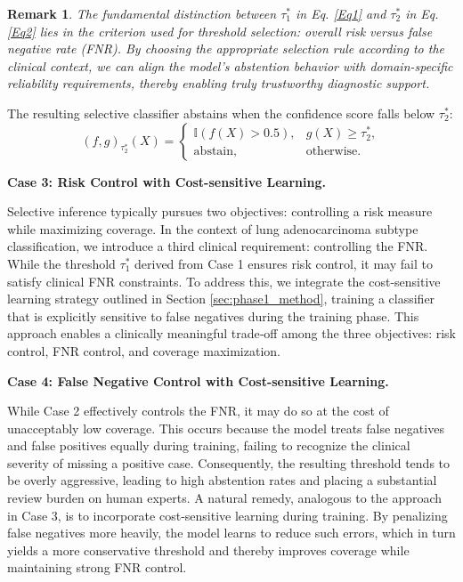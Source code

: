 \documentclass[journal,twoside,web]{ieeecolor}
\newtheorem{remark}[theorem]{Remark}
\begin{document}
\begin{remark}
The fundamental distinction between $\tau_{1}^{*}$ in Eq. \ref{Eq1} and $\tau_{2}^{*}$ in Eq. \ref{Eq2} lies in the criterion used for threshold selection: overall risk versus false negative rate (FNR). By choosing the appropriate selection rule according to the clinical context, we can align the model's abstention behavior with domain-specific reliability requirements, thereby enabling truly trustworthy diagnostic support.
\end{remark}

The resulting selective classifier abstains when the confidence score falls below $\tau_{2}^*$:
\[
(f,g)_{\tau_{2}^*}(X)=
\begin{cases}
\mathbb{I}\!\left(f(X)>0.5\right), & g(X)\geq \tau_{2}^*,\\[4pt]
\text{abstain}, & \text{otherwise}.
\end{cases}
\]


\textbf{Case 3: Risk Control with Cost-sensitive Learning.}

Selective inference typically pursues two objectives: controlling a risk measure while maximizing coverage. In the context of lung adenocarcinoma subtype classification, we introduce a third clinical requirement: controlling the FNR. While the threshold \(\tau_{1}^{*}\) derived from Case 1 ensures risk control, it may fail to satisfy clinical FNR constraints. To address this, we integrate the cost-sensitive learning strategy outlined in Section \ref{sec:phase1_method}, training a classifier that is explicitly sensitive to false negatives during the training phase. This approach enables a clinically meaningful trade‑off among the three objectives: risk control, FNR control, and coverage maximization.

\textbf{Case 4: False Negative Control with Cost-sensitive Learning.}

While Case 2 effectively controls the FNR, it may do so at the cost of unacceptably low coverage. This occurs because the model treats false negatives and false positives equally during training, failing to recognize the clinical severity of missing a positive case. Consequently, the resulting threshold tends to be overly aggressive, leading to high abstention rates and placing a substantial review burden on human experts. A natural remedy, analogous to the approach in Case 3, is to incorporate cost‑sensitive learning during training. By penalizing false negatives more heavily, the model learns to reduce such errors, which in turn yields a more conservative threshold and thereby improves coverage while maintaining strong FNR control.
\end{document}
